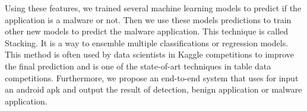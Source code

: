 Using these features, we trained several machine learning models to predict if the application is a malware or not. Then we use these models predictions to train other new models to predict the malware application. This technique is called Stacking. It is a way to ensemble multiple classifications or regression models. This method is often used by data scientists in Kaggle \cite{kaggle} competitions to improve the final prediction and is one of the state-of-art techniques in table data competitions.
Furthermore, we propose an end-to-end system that uses for input an android \ac{apk} and output the result of detection, benign application or malware application. 

